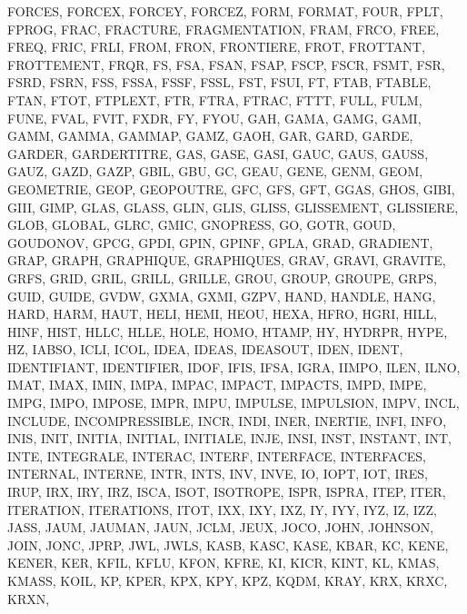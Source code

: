 {{{		FORCES,
		FORCEX,
		FORCEY,
		FORCEZ,
		FORM,
		FORMAT,
		FOUR,
		FPLT,
		FPROG,
		FRAC,
		FRACTURE,
		FRAGMENTATION,
		FRAM,
		FRCO,
		FREE,
		FREQ,
		FRIC,
		FRLI,
		FROM,
		FRON,
		FRONTIERE,
		FROT,
		FROTTANT,
		FROTTEMENT,
		FRQR,
		FS,
		FSA,
		FSAN,
		FSAP,
		FSCP,
		FSCR,
		FSMT,
		FSR,
		FSRD,
		FSRN,
		FSS,
		FSSA,
		FSSF,
		FSSL,
		FST,
		FSUI,
		FT,
		FTAB,
		FTABLE,
		FTAN,
		FTOT,
		FTPLEXT,
		FTR,
		FTRA,
		FTRAC,
		FTTT,
		FULL,
		FULM,
		FUNE,
		FVAL,
		FVIT,
		FXDR,
		FY,
		FYOU,
		GAH,
		GAMA,
		GAMG,
		GAMI,
		GAMM,
		GAMMA,
		GAMMAP,
		GAMZ,
		GAOH,
		GAR,
		GARD,
		GARDE,
		GARDER,
		GARDERTITRE,
		GAS,
		GASE,
		GASI,
		GAUC,
		GAUS,
		GAUSS,
		GAUZ,
		GAZD,
		GAZP,
		GBIL,
		GBU,
		GC,
		GEAU,
		GENE,
		GENM,
		GEOM,
		GEOMETRIE,
		GEOP,
		GEOPOUTRE,
		GFC,
		GFS,
		GFT,
		GGAS,
		GHOS,
		GIBI,
		GIII,
		GIMP,
		GLAS,
		GLASS,
		GLIN,
		GLIS,
		GLISS,
		GLISSEMENT,
		GLISSIERE,
		GLOB,
		GLOBAL,
		GLRC,
		GMIC,
		GNOPRESS,
		GO,
		GOTR,
		GOUD,
		GOUDONOV,
		GPCG,
		GPDI,
		GPIN,
		GPINF,
		GPLA,
		GRAD,
		GRADIENT,
		GRAP,
		GRAPH,
		GRAPHIQUE,
		GRAPHIQUES,
		GRAV,
		GRAVI,
		GRAVITE,
		GRFS,
		GRID,
		GRIL,
		GRILL,
		GRILLE,
		GROU,
		GROUP,
		GROUPE,
		GRPS,
		GUID,
		GUIDE,
		GVDW,
		GXMA,
		GXMI,
		GZPV,
		HAND,
		HANDLE,
		HANG,
		HARD,
		HARM,
		HAUT,
		HELI,
		HEMI,
		HEOU,
		HEXA,
		HFRO,
		HGRI,
		HILL,
		HINF,
		HIST,
		HLLC,
		HLLE,
		HOLE,
		HOMO,
		HTAMP,
		HY,
		HYDRPR,
		HYPE,
		HZ,
		IABSO,
		ICLI,
		ICOL,
		IDEA,
		IDEAS,
		IDEASOUT,
		IDEN,
		IDENT,
		IDENTIFIANT,
		IDENTIFIER,
		IDOF,
		IFIS,
		IFSA,
		IGRA,
		IIMPO,
		ILEN,
		ILNO,
		IMAT,
		IMAX,
		IMIN,
		IMPA,
		IMPAC,
		IMPACT,
		IMPACTS,
		IMPD,
		IMPE,
		IMPG,
		IMPO,
		IMPOSE,
		IMPR,
		IMPU,
		IMPULSE,
		IMPULSION,
		IMPV,
		INCL,
		INCLUDE,
		INCOMPRESSIBLE,
		INCR,
		INDI,
		INER,
		INERTIE,
		INFI,
		INFO,
		INIS,
		INIT,
		INITIA,
		INITIAL,
		INITIALE,
		INJE,
		INSI,
		INST,
		INSTANT,
		INT,
		INTE,
		INTEGRALE,
		INTERAC,
		INTERF,
		INTERFACE,
		INTERFACES,
		INTERNAL,
		INTERNE,
		INTR,
		INTS,
		INV,
		INVE,
		IO,
		IOPT,
		IOT,
		IRES,
		IRUP,
		IRX,
		IRY,
		IRZ,
		ISCA,
		ISOT,
		ISOTROPE,
		ISPR,
		ISPRA,
		ITEP,
		ITER,
		ITERATION,
		ITERATIONS,
		ITOT,
		IXX,
		IXY,
		IXZ,
		IY,
		IYY,
		IYZ,
		IZ,
		IZZ,
		JASS,
		JAUM,
		JAUMAN,
		JAUN,
		JCLM,
		JEUX,
		JOCO,
		JOHN,
		JOHNSON,
		JOIN,
		JONC,
		JPRP,
		JWL,
		JWLS,
		KASB,
		KASC,
		KASE,
		KBAR,
		KC,
		KENE,
		KENER,
		KER,
		KFIL,
		KFLU,
		KFON,
		KFRE,
		KI,
		KICR,
		KINT,
		KL,
		KMAS,
		KMASS,
		KOIL,
		KP,
		KPER,
		KPX,
		KPY,
		KPZ,
		KQDM,
		KRAY,
		KRX,
		KRXC,
		KRXN,
}}}
